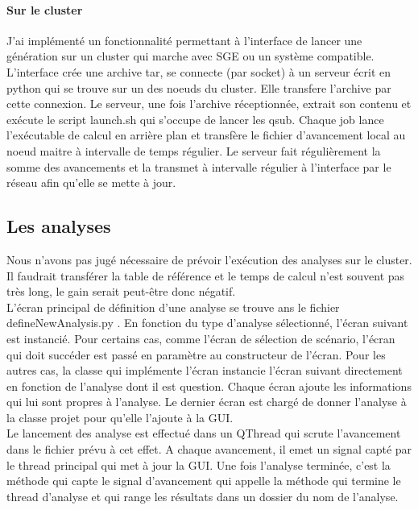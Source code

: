 \documentclass[12pt,a4paper]{article}
\begin{document}
        \paragraph{Sur le cluster}
        J'ai implémenté un fonctionnalité permettant à l'interface de lancer une
        génération sur un cluster qui marche avec SGE ou un système compatible.
        L'interface crée une archive tar, se connecte (par socket) à un serveur
        écrit en python qui se trouve sur un des noeuds du cluster. Elle
        transfere l'archive par cette connexion.  Le serveur, une fois
        l'archive réceptionnée, extrait son contenu et exécute le script
        launch.sh qui s'occupe de lancer les qsub. Chaque job lance l'exécutable
        de calcul en arrière plan et transfère le fichier d'avancement local au
        noeud maitre à intervalle de temps régulier. Le serveur fait
        régulièrement la somme des avancements et la transmet à intervalle
        régulier à l'interface par le réseau afin qu'elle se mette à jour.


    \subsection{Les analyses}
        Nous n'avons pas jugé nécessaire de prévoir l'exécution des analyses sur
        le cluster. Il faudrait transférer la table de référence et le temps de
        calcul n'est souvent pas très long, le gain serait peut-être donc
        négatif.\\

        L'écran principal de définition d'une analyse se trouve ans le fichier
        defineNewAnalysis.py . En fonction du type d'analyse sélectionné,
        l'écran suivant est instancié. Pour certains cas, comme l'écran de
        sélection de scénario, l'écran qui doit succéder est passé en paramètre
        au constructeur de l'écran. Pour les autres cas, la classe qui
        implémente l'écran instancie l'écran suivant directement en fonction de
        l'analyse dont il est question. Chaque écran ajoute les informations qui
        lui sont propres à l'analyse. Le dernier écran est chargé de donner
        l'analyse à la classe projet pour qu'elle l'ajoute à la GUI.\\

        Le lancement des analyse est effectué dans un QThread qui scrute
        l'avancement dans le fichier prévu à cet effet. A chaque avancement, il
        emet un signal capté par le thread principal qui met à jour la GUI. Une
        fois l'analyse terminée, c'est la méthode qui capte le signal
        d'avancement qui appelle la méthode qui termine le thread d'analyse et
        qui range les résultats dans un dossier du nom de l'analyse.
\end{document}
